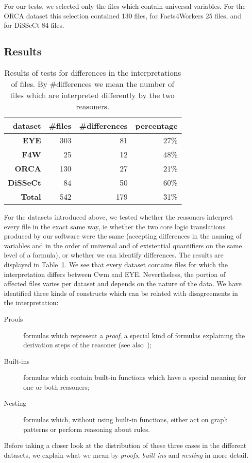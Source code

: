 For our tests, we selected only the files which contain universal variables. For the ORCA dataset this selection contained 130 files, for Facts4Workers 25 files,
and for DiSSeCt 84 files.


\subsection{Results}\label{results}
\begin{table}
\begin{center}
\begin{tabular}{rrrr}
\hline
\bf dataset& \bf \#files & \bf \#differences & \bf percentage\\
\hline
 \bf EYE &303 & 81 &  27\%\\
 \bf F4W &25 & 12 &  48\% \\
 \bf ORCA & 130& 27 & 21\%\\
 \bf DiSSeCt & 84&50&  60\%\\
 \hline
 \bf Total & 542 & 179& 31\%\\
 \hline
\end{tabular}
\end{center}
\caption{Results of tests for differences in the interpretations of \nthree files. By \#differences we mean the number of files which are interpreted differently 
by the two reasoners.\label{result}}
\end{table}
For the datasets introduced above, we  tested whether the reasoners interpret every file in the exact same way, ie whether the two 
core logic translations produced by our 
software were the same (accepting differences in the naming of variables and in the order of universal and of existential quantifiers on the same 
level of a formula), 
or whether we can identify differences. The results 
are displayed 
in Table~\ref{result}. We see that every dataset contains files for which the interpretation differs between Cwm and EYE. Nevertheless, 
the portion of affected files varies per dataset and depends on the nature of the data. We have identified three kinds of constructs which can be related with disagreements 
in the interpretation:
\begin{description}
  \item[Proofs] formulas which represent a \emph{proof}, a special kind of \nthree formulas explaining the derivation steps of the reasoner (see also~\cite{PP});
  \item[Built-ins] formulas which contain built-in functions which have a special meaning for one or both reasoners;
  \item[Nesting] formulas which, without using built-in functions, either act on graph patterns or perform
reasoning about rules.
\end{description}
Before taking a closer look at the distribution of these three cases in the different datasets, 
we explain what we mean by \emph{proofs}, \emph{built-ins} and \emph{nesting} in more detail.


